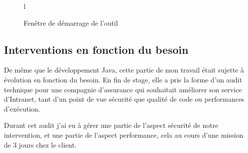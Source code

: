 \begin{figure}{l}
	\caption{Fenêtre de démarrage de l'outil}
	\label{fig:accueil}
\end{figure}

\subsection{Interventions en fonction du besoin}
De même que le développement Java, cette partie de mon travail était sujette à évolution en fonction du besoin. En fin de stage, elle a pris la forme d'un audit technique pour une compagnie d'assurance qui souhaitait améliorer son service d'Intranet, tant d'un point de vue sécurité que qualité de code ou performances d'exécution.

Durant cet audit j'ai eu à gérer une partie de l'aspect sécurité de notre intervention, et une partie de l'aspect performance, cela au cours d'une mission de 3 jours chez le client.